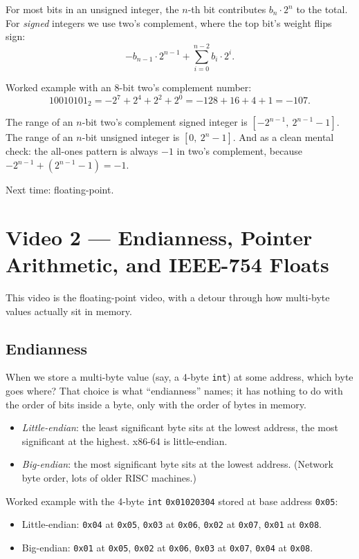 \documentclass[11pt]{article}
\begin{document}
For most bits in an unsigned integer, the $n$-th bit contributes
$b_n \cdot 2^n$ to the total. For \emph{signed} integers we use
two's complement, where the top bit's weight flips sign:
\[
  -b_{n-1} \cdot 2^{n-1} + \sum_{i=0}^{n-2} b_i \cdot 2^i.
\]

Worked example with an 8-bit two's complement number:
\[
  10010101_2 = -2^7 + 2^4 + 2^2 + 2^0
             = -128 + 16 + 4 + 1 = -107.
\]

The range of an $n$-bit two's complement signed integer is
$[-2^{n-1},\ 2^{n-1}-1]$. The range of an $n$-bit unsigned integer is
$[0,\ 2^n - 1]$. And as a clean mental check: the all-ones pattern is
always $-1$ in two's complement, because
$-2^{n-1} + (2^{n-1} - 1) = -1$.

Next time: floating-point.

\section{Video 2 --- Endianness, Pointer Arithmetic, and IEEE-754 Floats}

This video is the floating-point video, with a detour through how
multi-byte values actually sit in memory.

\subsection*{Endianness}

When we store a multi-byte value (say, a 4-byte \texttt{int}) at some
address, which byte goes where? That choice is what ``endianness''
names; it has nothing to do with the order of bits inside a byte, only
with the order of bytes in memory.

\begin{itemize}
  \item \emph{Little-endian}: the least significant byte sits at the
    lowest address, the most significant at the highest. x86-64 is
    little-endian.
  \item \emph{Big-endian}: the most significant byte sits at the
    lowest address. (Network byte order, lots of older RISC machines.)
\end{itemize}

Worked example with the 4-byte \texttt{int} \texttt{0x01020304} stored
at base address \texttt{0x05}:

\begin{itemize}
  \item Little-endian: \texttt{0x04} at \texttt{0x05}, \texttt{0x03}
    at \texttt{0x06}, \texttt{0x02} at \texttt{0x07}, \texttt{0x01} at
    \texttt{0x08}.
  \item Big-endian: \texttt{0x01} at \texttt{0x05}, \texttt{0x02} at
    \texttt{0x06}, \texttt{0x03} at \texttt{0x07}, \texttt{0x04} at
    \texttt{0x08}.
\end{itemize}
\end{document}
